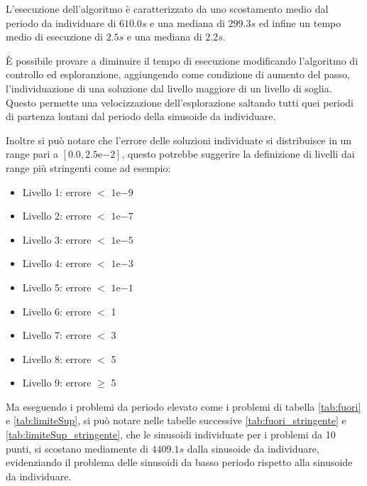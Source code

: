 \documentclass[a4paper,12pt]{report}
\newcommand{\expnumber}[2]{{#1}\mathrm{e}{#2}}
\begin{document}
L'esecuzione dell'algoritmo è caratterizzato da uno scostamento medio dal periodo da individuare di $610.0s$ e una mediana di $299.3s$ ed infine un tempo medio di esecuzione di $2.5s$ e una mediana di $2.2s$.

È possibile provare a diminuire il tempo di esecuzione modificando l'algoritmo di controllo ed esploranzione, aggiungendo come condizione di aumento del passo, l'individuazione di una soluzione dal livello maggiore di un livello di soglia. Questo permette una velocizzazione dell'esplorazione saltando tutti quei periodi di partenza lontani dal periodo della sinusoide da individuare.

Inoltre si può notare che l'errore delle soluzioni individuate si distribuisce in un range pari a $[0.0, \expnumber{2.5}{-2}]$, questo potrebbe suggerire  la definizione di livelli dai range più stringenti come ad esempio:

\begin{itemize}
  \item Livello 1: errore $<$ $\expnumber{1}{-9}$
  \item Livello 2: errore $<$ $\expnumber{1}{-7}$
  \item Livello 3: errore $<$ $\expnumber{1}{-5}$
  \item Livello 4: errore $<$ $\expnumber{1}{-3}$
  \item Livello 5: errore $<$ $\expnumber{1}{-1}$
  \item Livello 6: errore $<$ 1
  \item Livello 7: errore $<$ 3
  \item Livello 8: errore $<$ 5
  \item Livello 9: errore $\geq$ 5
\end{itemize}

Ma eseguendo i problemi da periodo elevato come i problemi di tabella \ref{tab:fuori} e \ref{tab:limiteSup}, si può notare nelle tabelle successive \ref{tab:fuori_stringente} e \ref{tab:limiteSup_stringente}, che le sinusoidi individuate per i problemi da 10 punti, si scostano mediamente di $4409.1s$ dalla sinusoide da individuare, evidenziando il problema delle sinusoidi da basso periodo rispetto alla sinusoide da individuare.
\end{document}
